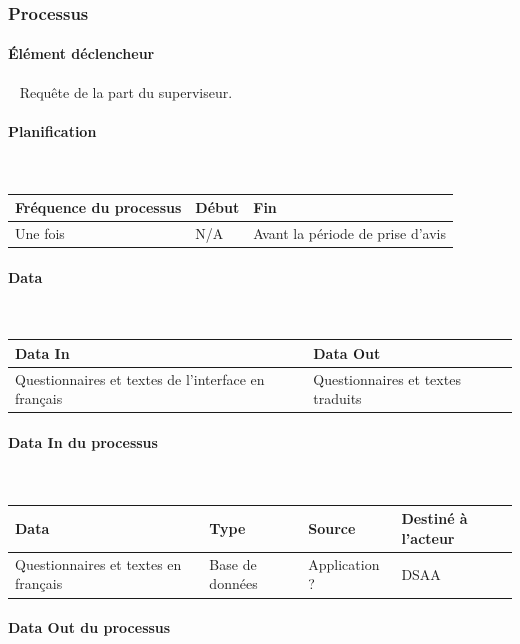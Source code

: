 \documentclass[a4paper,11pt]{report}
\begin{document}
\subsubsection{Processus}
\paragraph{Élément déclencheur}~\newline{}
Requête de la part du superviseur.

\paragraph{Planification}~\newline{}

\begin{tabularx}{\linewidth}{|X|X|X|} \hline
Fréquence du processus & Début & Fin \\ \hline
Une fois & N/A & Avant la période de prise d'avis \\ \hline
\end{tabularx}

\paragraph{Data}~\newline{}

\begin{tabularx}{\linewidth}{|X|X|} \hline
Data In & Data Out \\ \hline
Questionnaires et textes de l'interface en français & Questionnaires et textes traduits\\ \hline
\end{tabularx}

\paragraph{Data In du processus}~\newline{}

\begin{tabularx}{\linewidth}{|X|X|X|X|} \hline
Data & Type & Source & Destiné à l'acteur \\ \hline
Questionnaires et textes en français & Base de données & Application ? & DSAA\\ \hline
\end{tabularx}

\paragraph{Data Out du processus}~\newline{}
\end{document}
